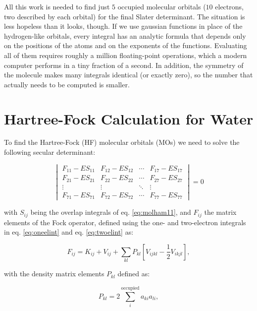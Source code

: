 \documentclass[
  english,
  9pt,
]{extbook}
\theoremstyle{definition}
\theoremstyle{definition}
\theoremstyle{definition}
\theoremstyle{definition}
\theoremstyle{remark}
\begin{document}
All this work is needed to find just \(5\) occupied molecular orbitals (\(10\) electrons, two described by each orbital) for the final Slater determinant. The situation is less hopeless than it looks, though. If we use gaussian functions in place of the hydrogen-like orbitals, every integral has an analytic formula that depends only on the positions of the atoms and on the exponents of the functions. Evaluating all of them requires roughly a million floating-point operations, which a modern computer performs in a tiny fraction of a second. In addition, the symmetry of the molecule makes many integrals identical (or exactly zero), so the number that actually needs to be computed is smaller.

\section{Hartree-Fock Calculation for Water}\label{hartree-fock-calculation-for-water}

To find the Hartree-Fock (HF) molecular orbitals (MOs) we need to solve the following secular determinant:

\begin{equation}
\begin{vmatrix}
F_{11}-ES_{11}   & F_{12}-ES_{12}   & \cdots & F_{17}-ES_{17}\\
F_{21}-ES_{21}   & F_{22}-ES_{22}   & \cdots & F_{27}-ES_{27}\\
\vdots           &   \vdots         & \ddots & \vdots\\
F_{71}-ES_{71}   & F_{72}-ES_{72}   & \cdots & F_{77}-ES_{77}
\end{vmatrix}=0
\label{eq:hfequationh2o}
\end{equation}

with \(S_{ij}\) being the overlap integrals of eq. \eqref{eq:molham11}, and \(F_{ij}\) the matrix elements of the Fock operator, defined using the one- and two-electron integrals in eq. \eqref{eq:oneelint} and eq. \eqref{eq:twoelint} as:

\begin{equation}
F_{ij} = K_{ij} + V_{ij} + \sum_{kl} P_{kl} \left[ V_{ijkl} -\frac{1}{2}V_{ikjl} \right],
\label{eq:HFmatrixelement}
\end{equation}

with the density matrix elements \(P_{kl}\) defined as:

\begin{equation}
P_{kl} = 2 \sum_{i}^{\mathrm{occupied}} a_{ki}a_{li},
\label{eq:densitymatrixelement}
\end{equation}
\end{document}
